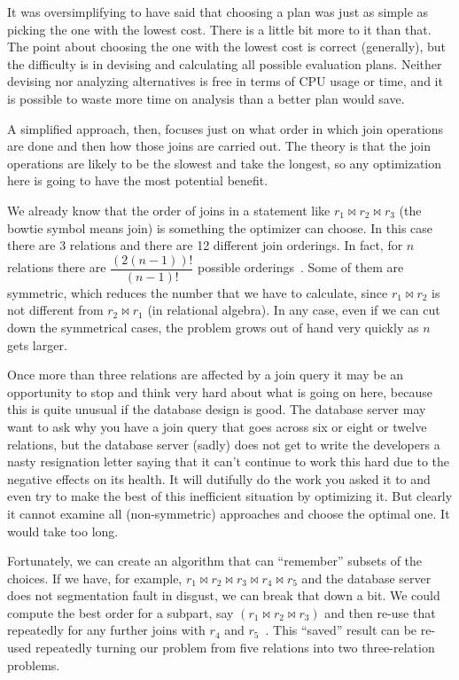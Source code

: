 It was oversimplifying to have said that choosing a plan was just as simple as picking the one with the lowest cost. There is a little bit more to it than that. The point about choosing the one with the lowest cost is correct (generally), but the difficulty is in devising and calculating all possible evaluation plans. Neither devising nor analyzing alternatives is free in terms of CPU usage or time, and it is possible to waste more time on analysis than a better plan would save. 

A simplified approach, then, focuses just on what order in which join operations are done and then how those joins are carried out. The theory is that the join operations are likely to be the slowest and take the longest, so any optimization here is going to have the most potential benefit.

We already know that the order of joins in a statement like $r_{1} \bowtie r_{2} \bowtie r_{3}$ (the bowtie symbol means join) is something the optimizer can choose. In this case there are 3 relations and there are 12 different join orderings. In fact, for $n$ relations there are $\dfrac{(2(n-1))!}{(n-1)!}$ possible orderings~\cite{dsc}. Some of them are symmetric, which reduces the number that we have to calculate, since $r_{1} \bowtie r_{2}$ is not different from $r_{2} \bowtie r_{1}$ (in relational algebra). In any case, even if we can cut down the symmetrical cases, the problem grows out of hand very quickly as $n$ gets larger. 

Once more than three relations are affected by a join query it may be an opportunity to stop and think very hard about what is going on here, because this is quite unusual if the database design is good. The database server may want to ask why you have a join query that goes across six or eight or twelve relations, but the database server (sadly) does not get to write the developers a nasty resignation letter saying that it can't continue to work this hard due to the negative effects on its health. It will dutifully do the work you asked it to and even try to make the best of this inefficient situation by optimizing it. But clearly it cannot examine all (non-symmetric) approaches and choose the optimal one. It would take too long.

Fortunately, we can create an algorithm that can ``remember'' subsets of the choices. If we have, for example, $r_{1} \bowtie r_{2} \bowtie r_{3} \bowtie r_{4} \bowtie r_{5}$ and the database server does not segmentation fault in disgust, we can break that down a bit. We could compute the best order for a subpart, say $(r_{1} \bowtie r_{2} \bowtie r_{3})$ and then re-use that repeatedly for any further joins with $r_{4}$ and $r_{5}$~\cite{dsc}. This ``saved'' result can be re-used repeatedly turning our problem from five relations into two three-relation problems.

